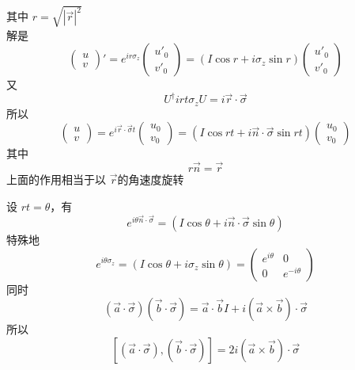 \documentclass[hyperref,UTF8]{ctexart}
\begin{document}
其中 $r=\sqrt{|\vec{r}|^2}$ 
\\解是
\[\begin{pmatrix}
    u\\v
\end{pmatrix}'=e^{ir\sigma_z}\begin{pmatrix}
    u'_0\\v'_0
\end{pmatrix}=(I\cos r+i\sigma_z\sin r)\begin{pmatrix}
    u'_0\\v'_0
\end{pmatrix}\]
又
\[U^\dagger irt\sigma_z  U=i\vec{r}\cdot\vec{\sigma}\]
所以
\[\begin{pmatrix}
    u\\v
\end{pmatrix}=e^{i\vec{r}\cdot\vec{\sigma}t}\begin{pmatrix}
    u_0\\v_0
\end{pmatrix}=(I\cos rt+i\vec{n}\cdot\vec{\sigma}\sin rt)\begin{pmatrix}
    u_0\\v_0
\end{pmatrix}\]
其中
\[r\vec{n}=\vec{r}\]
上面的作用相当于以 $\vec{r}$的角速度旋转 

设 $rt=\theta$，有
\[e^{i\theta\vec{n}\cdot\vec{\sigma}}=(I\cos \theta+i\vec{n}\cdot\vec{\sigma}\sin \theta)\]
特殊地
\[e^{i\theta\sigma_z}=(I\cos \theta+i\sigma_z\sin \theta)=\begin{pmatrix}
    e^{i\theta}&0\\
    0&e^{-i\theta}
\end{pmatrix}\]
同时
\[(\vec{a}\cdot\vec{\sigma})(\vec{b}\cdot\vec{\sigma})=\vec{a}\cdot\vec{b}I+i(\vec{a}\times \vec{b})\cdot\vec{\sigma}\]
所以
\[[(\vec{a}\cdot\vec{\sigma}),(\vec{b}\cdot\vec{\sigma})]=2i(\vec{a}\times \vec{b})\cdot\vec{\sigma}\]
\end{document}
